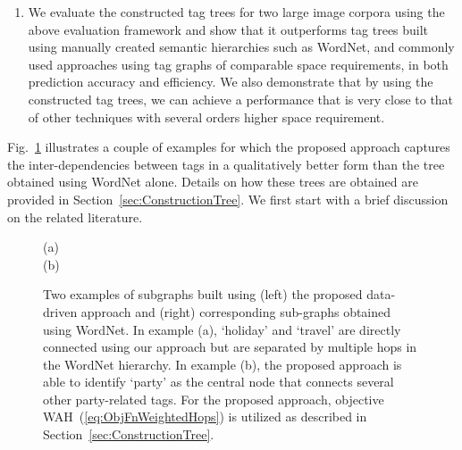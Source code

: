 {\begin{enumerate}
{}
    \item We evaluate the constructed tag trees for two large image corpora using the above evaluation framework and show that it outperforms tag trees built using manually created semantic hierarchies such as WordNet, and commonly used approaches using tag graphs of comparable space requirements, in both prediction accuracy and efficiency. We also demonstrate that by using the constructed tag trees, we can achieve a performance that is very close to that of other techniques with several orders higher space requirement. 
\end{enumerate}

}


\indent Fig.~\ref{fig:todo} illustrates a couple of examples for which the proposed approach captures the inter-dependencies between tags in a qualitatively better form than the tree obtained using WordNet alone. Details on how these trees are obtained are provided in Section~\ref{sec:ConstructionTree}. We first start with a brief discussion on the related literature.
\begin{figure}
\centering
(a)
\hspace{0.05cm}
\vline
\hspace{0.05cm}
\vspace{0.25cm}
\\
(b)
\hspace{0.01cm}
\vline
\hspace{0.05cm}
\caption[Two examples of subgraphs built using the proposed data-driven approach and corresponding sub-graphs obtained using WordNet. ]{Two examples of subgraphs built using (left) the proposed data-driven approach and (right) corresponding sub-graphs obtained using WordNet. In example (a), `holiday' and `travel' are directly connected using our approach but are separated by multiple hops in the WordNet hierarchy. In example (b), the proposed approach is able to identify `party' as the central node that connects several other party-related tags. For the proposed approach, objective WAH~(\ref{eq:ObjFnWeightedHops}) is utilized as described in Section~\ref{sec:ConstructionTree}.}
\label{fig:todo}
\end{figure}